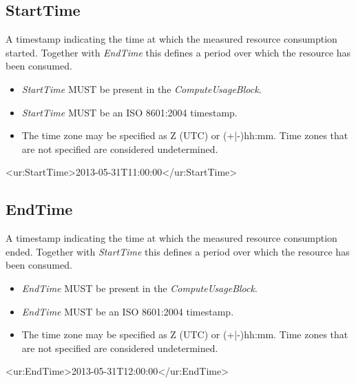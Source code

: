 


\subsection{StartTime} \label{ComputeStartTime}

A timestamp indicating the time at which the measured resource consumption started. Together with \emph{EndTime} this defines a period over which the resource has been consumed.
\begin{itemize}
\item \emph{StartTime} MUST be present in the \emph{ComputeUsageBlock}.
\item \emph{StartTime} MUST be an ISO 8601:2004 timestamp.
\item The time zone may be specified as Z (UTC) or (+|-)hh:mm. Time zones that are not specified are considered undetermined.
\end{itemize}

\begin{XMLexample}
<ur:StartTime>2013-05-31T11:00:00</ur:StartTime>
\end{XMLexample}






\subsection{EndTime} \label{ComputeEndTime}

A timestamp indicating the time at which the measured resource consumption ended. Together with \emph{StartTime} this defines a period over which the resource has been consumed.
\begin{itemize}
\item \emph{EndTime} MUST be present in the \emph{ComputeUsageBlock}.
\item \emph{EndTime} MUST be an ISO 8601:2004 timestamp.
\item The time zone may be specified as Z (UTC) or (+|-)hh:mm. Time zones that are not specified are considered undetermined.
\end{itemize}

\begin{XMLexample}
<ur:EndTime>2013-05-31T12:00:00</ur:EndTime>
\end{XMLexample}






